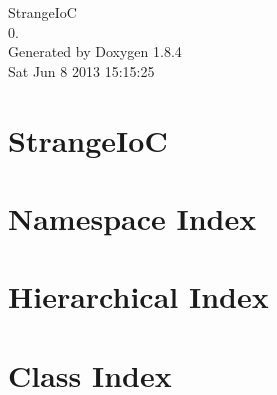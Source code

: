 \documentclass[twoside]{book}
\newcommand{\clearemptydoublepage}{%
  \newpage{\pagestyle{empty}\cleardoublepage}%
}
\begin{document}
\hypersetup{pageanchor=false}
\begin{titlepage}
\vspace*{7cm}
\begin{center}%
{\Large Strange\-Io\-C \\[1ex]\large 0. }\\
\vspace*{1cm}
{\large Generated by Doxygen 1.8.4}\\
\vspace*{0.5cm}
{\small Sat Jun 8 2013 15:15:25}\\
\end{center}
\end{titlepage}
\clearemptydoublepage
\tableofcontents
\clearemptydoublepage
{}
\hypersetup{pageanchor=true}

\chapter{Strange\-Io\-C}
\label{index}\hypertarget{index}{}
\chapter{Namespace Index}

\chapter{Hierarchical Index}

\chapter{Class Index}

\end{document}
